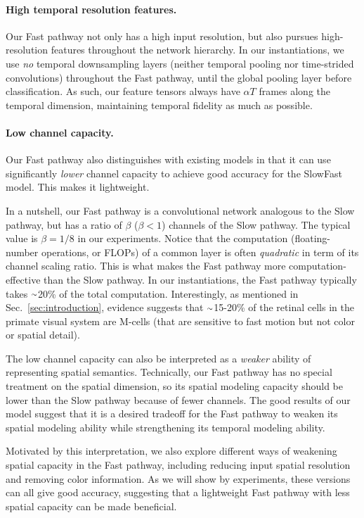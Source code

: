 \documentclass[10pt,twocolumn,letterpaper]{article}
\newcommand{\sref}[1]{Sec.~\ref{#1}}
\newcommand{\app}{\raise.17ex\hbox{$\scriptstyle\sim$}}
\renewcommand{\omega}{\alpha}
\renewcommand{\phi}{\beta}
\begin{document}
	\paragraph{High temporal resolution features.} Our Fast pathway not only has a high input resolution, but also pursues high-resolution features throughout the network hierarchy. In our instantiations, we use \emph{no} temporal downsampling layers (neither temporal pooling nor time-strided convolutions) throughout the Fast pathway, until the global pooling layer before classification. As such, our feature tensors always have $\omega T$ frames along the temporal dimension, maintaining temporal fidelity as much as possible.
	
	\paragraph{Low channel capacity.} Our Fast pathway also distinguishes with existing models in that it can use significantly \emph{lower} channel capacity to achieve good accuracy for the SlowFast model. This makes it lightweight.
	
	In a nutshell, our Fast pathway is a convolutional network analogous to the Slow pathway, but has a ratio of $\phi$ ($\phi<1$) channels of the Slow pathway. The typical value is $\phi=1/8$ in our experiments. Notice that the computation (floating-number operations, or FLOPs) of a common layer is often \emph{quadratic} in term of its channel scaling ratio. This is what makes the Fast pathway more computation-effective than the Slow pathway. In our instantiations, the Fast pathway typically takes $\app$20\% of the total computation. Interestingly, as mentioned in \sref{sec:introduction}, evidence suggests that $\app$15-20\% of the retinal cells in the primate visual system are M-cells (that are sensitive to fast motion but not color or spatial detail).
	
	The low channel capacity can also be interpreted as a \emph{weaker} ability of representing spatial semantics. Technically, our Fast pathway has no special treatment on the spatial dimension, so its spatial modeling capacity should be lower than the Slow pathway because of fewer channels. The good results of our model suggest that it is a desired tradeoff for the Fast pathway to weaken its spatial modeling ability while strengthening its temporal modeling ability.
	
	Motivated by this interpretation, we also explore different ways of weakening spatial capacity in the Fast pathway, including reducing input spatial resolution and removing color information. As we will show by experiments, these versions can all give good accuracy, suggesting that a lightweight Fast pathway with less spatial capacity can be made beneficial.
	
\end{document}
